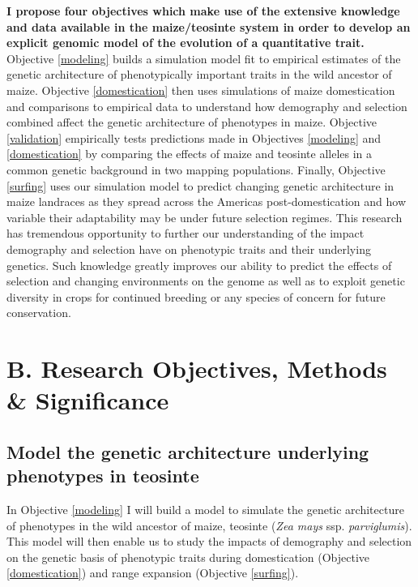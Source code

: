 \textbf{I propose four objectives which make use of the extensive knowledge and data available in the maize\//teosinte system in order to develop an explicit genomic model of the evolution of a quantitative trait.} Objective \ref{modeling} builds a simulation model fit to empirical estimates of the genetic architecture of phenotypically important traits in the wild ancestor of maize. Objective \ref{domestication} then uses simulations of maize domestication and comparisons to empirical data to understand how demography and selection combined affect the genetic architecture of phenotypes in maize.  Objective \ref{validation} empirically tests  predictions made in Objectives \ref{modeling} and \ref{domestication} by comparing the effects of maize and teosinte alleles in a common genetic background in two mapping populations. Finally, Objective \ref{surfing} uses our simulation model to predict changing genetic architecture in maize landraces as they spread across the Americas post-domestication and how variable their adaptability may be under future selection regimes. This research has tremendous opportunity to further our understanding of the impact demography and selection have on phenotypic traits and their underlying genetics. Such knowledge greatly improves our ability to predict the effects of selection and changing environments on the genome as well as to exploit genetic diversity in crops for continued breeding or any species of concern for future conservation. \vspace{-3ex}


\section*{B. Research Objectives, Methods \& Significance}\vspace{-1ex}

\renewcommand\thesubsection{\Roman {subsection}.}

\subsection{Model the genetic architecture underlying phenotypes in teosinte}\vspace{-1ex}
\label{modeling}
In Objective \ref{modeling} I will build a model to simulate the genetic architecture of phenotypes in the wild ancestor of maize, teosinte (\emph{Zea mays} ssp. \emph{parviglumis}). This model will then enable us to study the impacts of demography and selection on the genetic basis of phenotypic traits during domestication (Objective \ref{domestication}) and range expansion (Objective \ref{surfing}).

